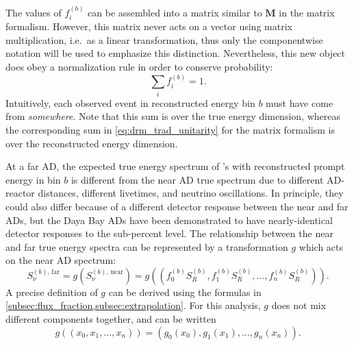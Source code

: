 The values of $f_i^{(b)}$ can be assembled into a matrix
similar to $\mathbf{M}$ in the matrix formalism.
However, this matrix never acts on a vector using matrix multiplication,
i.e.\ as a linear transformation,
thus only the componentwise notation will be used
to emphasize this distinction.
Nevertheless, this new object does obey a normalization rule
in order to conserve probability:
\begin{equation}\label{eq:drm_lbnl_unitarity}
    \sum_i f_i^{(b)} = 1.
\end{equation}
Intuitively, each observed event in reconstructed energy bin $b$
must have come from \emph{somewhere}.
Note that this sum is over the true energy dimension,
whereas the corresponding sum in \cref{eq:drm_trad_unitarity}
for the matrix formalism is over the reconstructed energy dimension.

At a far AD, the expected true energy spectrum of \nuebar{}'s
with reconstructed prompt energy in bin $b$
is different from the near AD true spectrum
due to different AD-reactor distances, different livetimes,
and neutrino oscillations.
In principle, they could also differ because of
a different detector response between the near and far ADs,
but the Daya Bay ADs have been demonstrated to have
nearly-identical detector responses to the sub-percent level.
The relationship between the near and far true energy spectra
can be represented by a transformation $g$ which acts on the near AD spectrum:
\begin{equation}\label{eq:drm_lbnl_transform}
    S_\nu^{(b),\,\text{far}} = g(S_\nu^{(b),\,\text{near}})
    = g((f_0^{(b)}S_R^{(b)}, f_1^{(b)}S_R^{(b)}, \ldots, f_n^{(b)}S_R^{(b)})).
\end{equation}
A precise definition of $g$ can be derived using the formulas in
\cref{subsec:flux_fraction,subsec:extrapolation}.
For this analysis, $g$ does not mix different components together,
and can be written
\begin{equation}\label{eq:drm_lbnl_g_components}
    g((x_0, x_1, \ldots, x_n)) = (g_0(x_0), g_1(x_1), \ldots, g_n(x_n)).
\end{equation}

